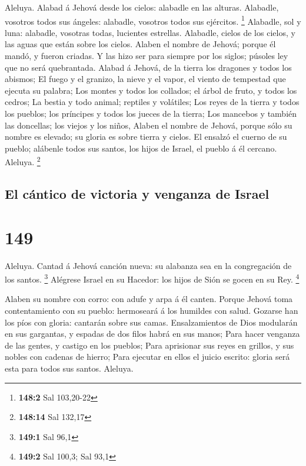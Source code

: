  Aleluya. Alabad á Jehová desde los cielos: alabadle en las
alturas.  Alabadle, vosotros todos sus ángeles: alabadle,
vosotros todos sus ejércitos. \footnote{\textbf{148:2} Sal 103,20-22}
 Alabadle, sol y luna: alabadle, vosotras todas, lucientes
estrellas.  Alabadle, cielos de los cielos, y las aguas que
están sobre los cielos.  Alaben el nombre de Jehová; porque
él mandó, y fueron criadas.  Y las hizo ser para siempre por
los siglos; púsoles ley que no será quebrantada.  Alabad á
Jehová, de la tierra los dragones y todos los abismos;  El
fuego y el granizo, la nieve y el vapor, el viento de tempestad que
ejecuta su palabra;  Los montes y todos los collados; el
árbol de fruto, y todos los cedros;  La bestia y todo
animal; reptiles y volátiles;  Los reyes de la tierra y
todos los pueblos; los príncipes y todos los jueces de la tierra;
 Los mancebos y también las doncellas; los viejos y los
niños,  Alaben el nombre de Jehová, porque sólo su nombre
es elevado; su gloria es sobre tierra y cielos.  El ensalzó
el cuerno de su pueblo; alábenle todos sus santos, los hijos de Israel,
el pueblo á él cercano. Aleluya. \footnote{\textbf{148:14} Sal 132,17}

\hypertarget{el-cuxe1ntico-de-victoria-y-venganza-de-israel}{%
\subsection{El cántico de victoria y venganza de
Israel}\label{el-cuxe1ntico-de-victoria-y-venganza-de-israel}}

\hypertarget{section-148}{%
\section{149}\label{section-148}}

 Aleluya. Cantad á Jehová canción nueva: su alabanza sea en
la congregación de los santos. \footnote{\textbf{149:1} Sal 96,1}
 Alégrese Israel en su Hacedor: los hijos de Sión se gocen
en su Rey. \footnote{\textbf{149:2} Sal 100,3; Sal 93,1}

 Alaben su nombre con corro: con adufe y arpa á él canten.
 Porque Jehová toma contentamiento con su pueblo: hermoseará
á los humildes con salud.  Gozarse han los píos con gloria:
cantarán sobre sus camas.  Ensalzamientos de Dios modularán
en sus gargantas, y espadas de dos filos habrá en sus manos;
 Para hacer venganza de las gentes, y castigo en los
pueblos;  Para aprisionar sus reyes en grillos, y sus nobles
con cadenas de hierro;  Para ejecutar en ellos el juicio
escrito: gloria será esta para todos sus santos. Aleluya.

